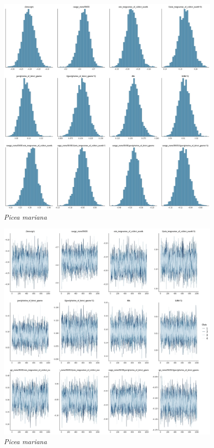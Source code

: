 \documentclass[letterpaper, 12pt]{article}
\begin{document}
\begin{figure}
	\centering
	\includegraphics[scale=0.4]{./183302-PIC-MAR_hist}
	\caption{\textit{Picea mariana}}
\end{figure}

\begin{figure}
	\centering
	\includegraphics[scale=0.4]{./183302-PIC-MAR_traces}
	\caption{\textit{Picea mariana}}
\end{figure}
\end{document}

